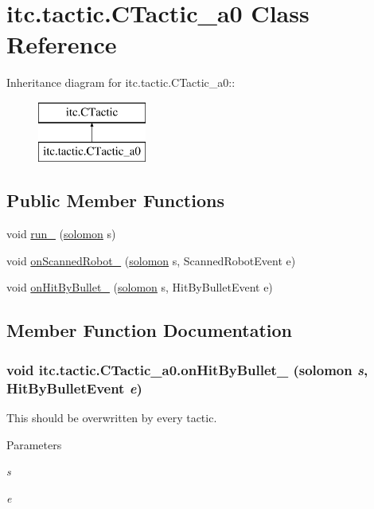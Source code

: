\hypertarget{classitc_1_1tactic_1_1_c_tactic__a0}{
\section{itc.tactic.CTactic\_\-a0 Class Reference}
\label{classitc_1_1tactic_1_1_c_tactic__a0}
}
Inheritance diagram for itc.tactic.CTactic\_\-a0::\begin{figure}[H]
\begin{center}
\leavevmode
\includegraphics[height=2cm]{classitc_1_1tactic_1_1_c_tactic__a0}
\end{center}
\end{figure}
\subsection*{Public Member Functions}
\begin{DoxyCompactItemize}
\item 
void \hyperlink{classitc_1_1tactic_1_1_c_tactic__a0_a7d6f39924f332a7ed8c53820a45d3834}{run\_\-} (\hyperlink{classitc_1_1solomon}{solomon} s)
\item 
void \hyperlink{classitc_1_1tactic_1_1_c_tactic__a0_aea5ad2191ee16822a129eafb37d91779}{onScannedRobot\_\-} (\hyperlink{classitc_1_1solomon}{solomon} s, ScannedRobotEvent e)
\item 
void \hyperlink{classitc_1_1tactic_1_1_c_tactic__a0_a8911e3200cb13cfab22082c0a718c0b9}{onHitByBullet\_\-} (\hyperlink{classitc_1_1solomon}{solomon} s, HitByBulletEvent e)
\end{DoxyCompactItemize}


\subsection{Member Function Documentation}
\hypertarget{classitc_1_1tactic_1_1_c_tactic__a0_a8911e3200cb13cfab22082c0a718c0b9}{
\subsubsection[{onHitByBullet\_\-}]{\setlength{\rightskip}{0pt plus 5cm}void itc.tactic.CTactic\_\-a0.onHitByBullet\_\- ({\bf solomon} {\em s}, \/  HitByBulletEvent {\em e})}}
\label{classitc_1_1tactic_1_1_c_tactic__a0_a8911e3200cb13cfab22082c0a718c0b9}
This should be overwritten by every tactic. 
\begin{DoxyParams}{Parameters}
\item[{\em s}]\item[{\em e}]\end{DoxyParams}


